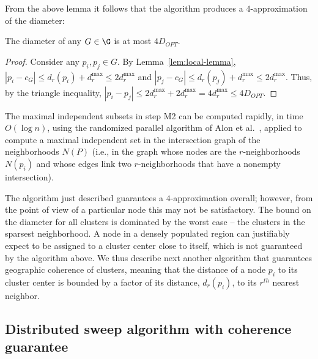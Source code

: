 From the above lemma it follows that the algorithm produces a $4$-approximation of the diameter:

\begin{corollary}
The diameter of any $G\in \G$ is at most $4D_{OPT}$.
\end{corollary}
\begin{proof}
Consider any $p_i,p_j\in G$.  By Lemma~\ref{lem:local-lemma}, 
$|p_i-c_G|\leq d_r(p_i)+d_r^{\max}\leq 2d_r^{\max}$ and
$|p_j-c_G|\leq d_r(p_j)+d_r^{\max}\leq 2d_r^{\max}$.
Thus, by the triangle inequality, $|p_i-p_j|\leq 2d_r^{\max} + 2d_r^{\max} = 4d_r^{\max} \leq 4D_{OPT}$. 
\end{proof}

The maximal independent subsets in step M2 can be computed rapidly, in time $O(\log n)$, using the randomized parallel algorithm of Alon et al.~\cite{alon1986fast}, applied to compute a maximal independent set in the intersection graph of the neighborhoods $N(P)$ (i.e., in the graph whose nodes are the $r$-neighborhoods $N(p_{i})$ and whose edges link two $r$-neighborhoods that have a nonempty intersection).


The algorithm just described guarantees a $4$-approximation overall; however, from the point of view of a particular node this may not be satisfactory. The bound on the diameter for all clusters is dominated by the worst case -- the clusters in the sparsest neighborhood. A node in a densely populated region can justifiably expect to be assigned to a cluster center close to itself, which is not guaranteed by the algorithm above. We thus describe next another algorithm that guarantees geographic coherence of clusters, meaning that the distance of a node $p_{i}$ to its cluster center is bounded by a factor of its distance, $d_{r}(p_{i})$, to its $r^{th}$ nearest neighbor. 

\subsection{Distributed sweep algorithm with coherence guarantee}

